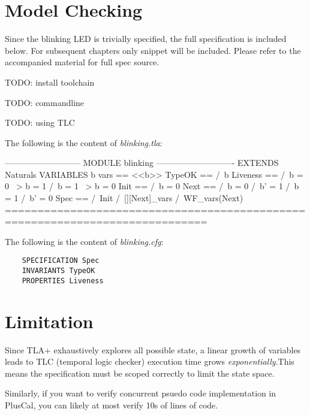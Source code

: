 \section{Model Checking}

Since the blinking LED is trivially specified, the full specification is
included below. For subsequent chapters only snippet will be included. Please
refer to the accompanied material for full spec source. 

TODO: install toolchain 

TODO: commandline

TODO: using TLC

The following is the content of \textit{blinking.tla}:
\begin{tla}
--------------------------- MODULE blinking ----------------------------
EXTENDS Naturals
VARIABLES b 
vars == <<b>>
TypeOK ==
  /\ b  
Liveness == 
    /\ b = 0 ~> b = 1
    /\ b = 1 ~> b = 0
Init ==
  /\ b = 0
Next ==
  \/ /\ b = 0
     /\ b' = 1
  \/ /\ b = 1
     /\ b' = 0
Spec ==
  /\ Init
  /\ [][Next]_vars
  /\ WF_vars(Next)
=============================================================================
\end{tla}
\begin{tlatex}
\@x{}\moduleLeftDash{}\moduleRightDash\@xx{}%
%
%
%
%
%
%
%
%
%
%
%
%
%
%
%
%
%
%
%
\@x{}\bottombar\@xx{}%
\end{tlatex}

The following is the content of \textit{blinking.cfg}:

\begin{lstlisting}
    SPECIFICATION Spec
    INVARIANTS TypeOK
    PROPERTIES Liveness
\end{lstlisting}

\section{Limitation}

Since TLA+ exhaustively explores all possible state, a linear growth of
variables leads to TLC (temporal logic checker) execution time grows
\textit{exponentially}.This means the specification must be scoped correctly to
limit the state space.\newline

Similarly, if you want to verify concurrent psuedo code implementation in
PlusCal, you can likely at most verify 10s of lines of code.

